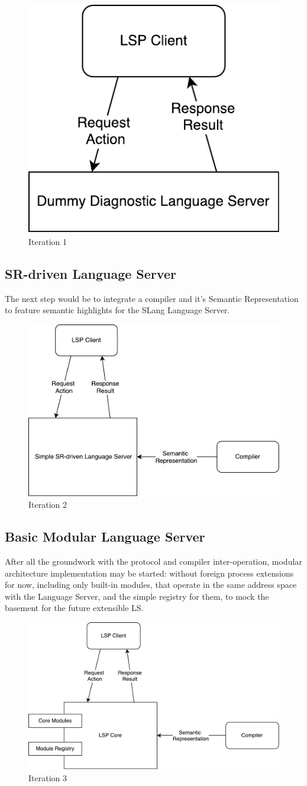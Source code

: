 \begin{figure}[H]
    \centering
    \includegraphics[width=.3\textwidth]{figs/ls_iteration_1.pdf}
    \caption{Iteration 1}
\end{figure}

\newpage
\subsection{SR-driven Language Server}
The next step would be to integrate a compiler and it's Semantic Representation
to feature semantic highlights for the SLang Language Server.
\begin{figure}[H]
    \centering
    \includegraphics[width=.6\textwidth]{figs/ls_iteration_2.pdf}
    \caption{Iteration 2}
\end{figure}

\subsection{Basic Modular Language Server}
After all the groundwork with the protocol and compiler inter-operation, 
modular architecture implementation may be started: without foreign process extensions for now,
including only built-in modules, that operate in the same address space with the Language Server,
and the simple registry for them, to mock the basement for the future extensible LS.

\begin{figure}[H]
    \centering
    \includegraphics[width=.6\textwidth]{figs/ls_iteration_3.pdf}
    \caption{Iteration 3}
\end{figure}

